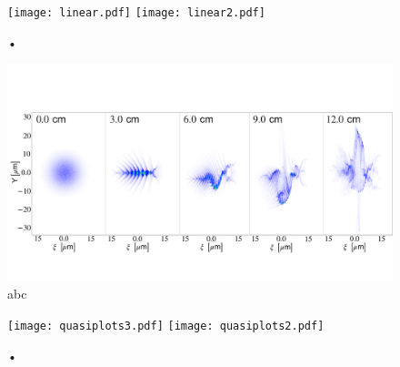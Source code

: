 \begin{figure}
\centering
\texttt{[image: linear.pdf]}\hspace{24pt}
\texttt{[image: linear2.pdf]}
\caption{•}
\label{linearplots}
\end{figure}
\clearpage
\begin{figure}
\centering
\includegraphics[width=\textwidth]{CherenkovInstability}
\caption{abc}
\label{cherenkov}
\end{figure}
\begin{figure}
\centering
\texttt{[image: quasiplots3.pdf]}\hspace{24pt}
\texttt{[image: quasiplots2.pdf]}
\caption{•}
\label{linearplots}
\end{figure}
